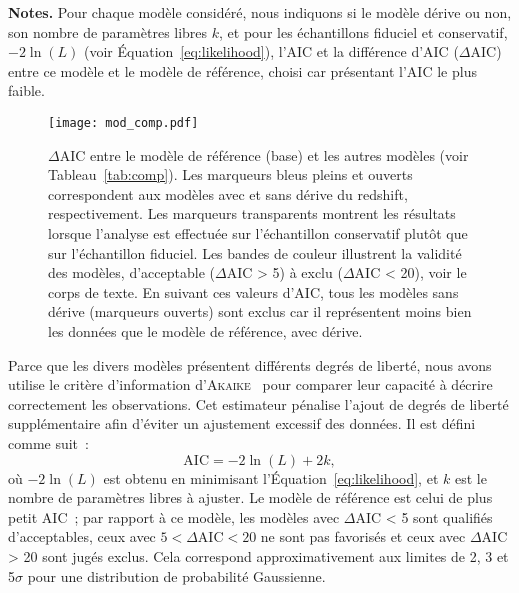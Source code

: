 \documentclass[../main/main.tex]{subfiles}
\begin{document}
\begin{table}[ht]
\begin{threeparttable}
\begin{tabular}{lcccccccc}
            \bottomrule
        \end{tabular}
        \begin{tablenotes}[flushleft]
            \item \textbf{\hspace{-3.2pt}Notes.} Pour chaque modèle considéré,
                nous indiquons si le modèle dérive ou non, son nombre de
                paramètres libres $k$, et pour les échantillons fiduciel et
                conservatif, $-2\ln(L)$ (voir Équation~\ref{eq:likelihood}),
                l'AIC et la différence d'AIC ($\Delta$AIC) entre ce modèle et le
                modèle de référence, choisi car présentant l'AIC le plus faible.
        \end{tablenotes}
    \end{threeparttable}
\end{table}

\begin{figure}[ht]
    \centering
    \texttt{[image: mod\_comp.pdf]}
    \caption[$\Delta$AIC entre le modèle de base et les autres
    modèles]{$\Delta$AIC entre le modèle de référence (base) et les autres
        modèles (voir Tableau~\ref{tab:comp}). Les marqueurs bleus pleins et
        ouverts correspondent aux modèles avec et sans dérive du redshift,
        respectivement. Les marqueurs transparents montrent les résultats
        lorsque l'analyse est effectuée sur l'échantillon conservatif plutôt que
        sur l'échantillon fiduciel. Les bandes de couleur illustrent la validité
        des modèles, d'acceptable ($\Delta$AIC > 5) à exclu ($\Delta$AIC < 20),
        voir le corps de texte. En suivant ces valeurs d'AIC, tous les modèles
        sans dérive (marqueurs ouverts) sont exclus car il représentent moins
    bien les données que le modèle de référence, avec dérive.}
    \label{fig:mod_comp}
\end{figure}

Parce que les divers modèles présentent différents degrés de liberté, nous avons
utilise le critère d'information d'\textsc{Akaike}~\citep[AIC, voir par
exemple][]{burnham2004} pour comparer leur capacité à décrire correctement les
observations. Cet estimateur pénalise l'ajout de degrés de liberté
supplémentaire afin d'éviter un ajustement excessif des données. Il est défini
comme suit~:
\begin{equation}\label{eq:aic}
    \mathrm{AIC} = -2\ln(L) + 2k,
\end{equation}
où $-2\ln(L)$ est obtenu en minimisant l'Équation~\ref{eq:likelihood}, et $k$
est le nombre de paramètres libres à ajuster. Le modèle de référence est celui
de plus petit AIC~; par rapport à ce modèle, les modèles avec $\Delta$AIC < 5
sont qualifiés d'acceptables, ceux avec $5 < \Delta\mathrm{AIC} < 20$ ne sont
pas favorisés et ceux avec $\Delta$AIC > 20 sont jugés exclus. Cela correspond
approximativement aux limites de 2, 3 et 5$\sigma$ pour une distribution de
probabilité Gaussienne.
\end{document}
